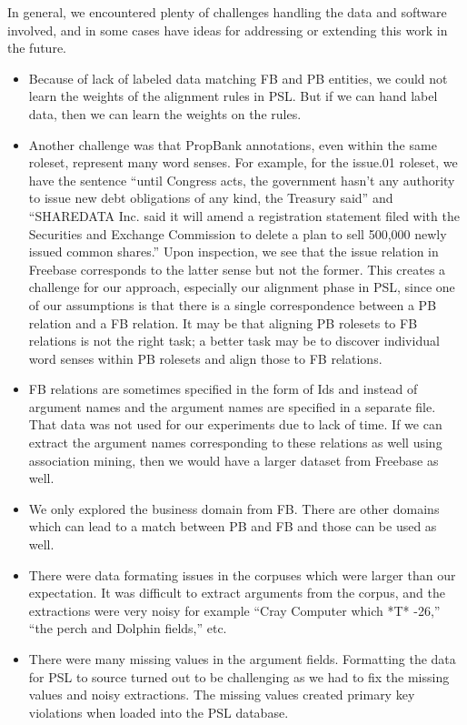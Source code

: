 In general, we encountered plenty of challenges handling the data and software involved, and in some cases have ideas for addressing or extending this work in the future.
\begin{itemize}
\item Because of lack of labeled data matching FB and PB entities, we could not learn the weights of the alignment rules in PSL. But if we can hand label data, then we can learn the weights on the rules.
\item Another challenge was that PropBank annotations, even within the same roleset, represent many word senses.
For example, for the issue.01 roleset, we have the sentence ``until Congress acts, the government hasn't any authority to issue new debt obligations of any kind, the Treasury said'' and ``SHAREDATA Inc. said it will amend a registration statement filed with the Securities and Exchange Commission to delete a plan to sell 500,000 newly issued common shares.''
Upon inspection, we see that the issue relation in Freebase corresponds to the latter sense but not the former.
This creates a challenge for our approach, especially our alignment phase in PSL, since one of our assumptions is that there is a single correspondence between a PB relation and a FB relation.
It may be that aligning PB rolesets to FB relations is not the right task; a better task may be to discover individual word senses within PB rolesets and align those to FB relations.
\item FB relations are sometimes specified in the form of Ids and instead of argument names and the argument names are specified in a separate file. That data was not used for our experiments due to lack of time. If we can extract the argument names corresponding to these relations as well using association mining, then we would have a larger dataset from Freebase as well.
\item We only explored the business domain from FB. There are other domains which can lead to a match between PB and FB and those can be used as well.
\item There were data formating issues in the corpuses which were larger than our expectation.  It was difficult to extract arguments from the corpus, and the extractions were very noisy for example ``Cray Computer which *T* -26,'' ``the perch and Dolphin fields,'' etc.
\item There were many missing values in the argument fields. Formatting the data for PSL to source turned out to be challenging as we had to fix the missing values and noisy extractions. The missing values created primary key violations when loaded into the PSL database.
\end{itemize}
